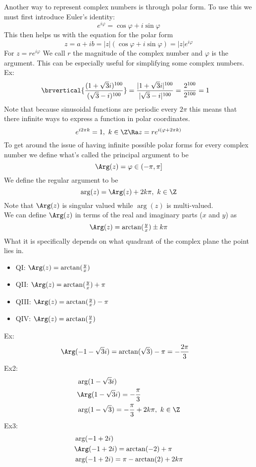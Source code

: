 Another way to represent complex numbers is through polar form. To use this we must first introduce Euler's identity:
$$e^{i\varphi}=\cos\varphi+i\sin\varphi$$
This then helps us with the equation for the polar form
$$z=a+ib=|z|(\cos\varphi+i\sin\varphi)=|z|e^{i\varphi}$$
For $z=re^{i\varphi}$ We call $r$ the magnitude of the complex number and $\varphi$ is the argument. This can be especially useful for simplifying some complex numbers.\\
Ex:
\begin{align*}
    &\brvertical{\frac{(1+\sqrt{3}i)^{100}}{(\sqrt{3}-i)^{100}}}=\frac{|1+\sqrt{3}i|^{100}}{|\sqrt{3}-i|^{100}}=\frac{2^{100}}{2^{100}}=1
\end{align*}
Note that because sinusoidal functions are periodic every $2\pi$ this means that there infinite ways to express a function in polar coordinates. 
\[
e^{i2\pi k}=1,\ k\in\Z\Ra z=re^{i(\varphi+2\pi k)}
\]
To get around the issue of having infinite possible polar forms for every complex number we define what's called the principal argument to be
$$\Arg(z)=\varphi\in(-\pi,\pi]$$
We define the regular argument to be
$$\arg(z)=\Arg(z)+2k\pi,\ k\in\Z$$
Note that $\Arg(z)$ is singular valued while $\arg(z)$ is multi-valued.\\
We can define $\Arg(z)$ in terms of the real and imaginary parts ($x$ and $y$) as
$$\Arg(z)=\arctan(\tfrac{y}{x})\pm k\pi$$
What it is specifically depends on what quadrant of the complex plane the point lies in.
\begin{itemize}
    \item QI: $\Arg(z)=\arctan(\tfrac{y}{x})$
    \item QII: $\Arg(z)=\arctan(\tfrac{y}{x})+\pi$
    \item QIII: $\Arg(z)=\arctan(\tfrac{y}{x})-\pi$
    \item QIV: $\Arg(z)=\arctan(\tfrac{y}{x})$
\end{itemize}
Ex:
\begin{align*}
    &\Arg(-1-\sqrt{3}i)=\arctan(\sqrt{3})-\pi=-\frac{2\pi}{3}
\end{align*}
Ex2:
\begin{align*}
    &\arg(1-\sqrt{3}i)\\
    &\Arg(1-\sqrt{3}i)=-\frac{\pi}{3}\\
    &\arg(1-\sqrt{3})=-\frac{\pi}{3}+2k\pi,\ k\in\Z
\end{align*}
Ex3:
\begin{align*}
    &\arg(-1+2i)\\
    &\Arg(-1+2i)=\arctan(-2)+\pi\\
    &\arg(-1+2i)=\pi-\arctan(2)+2k\pi
\end{align*}
